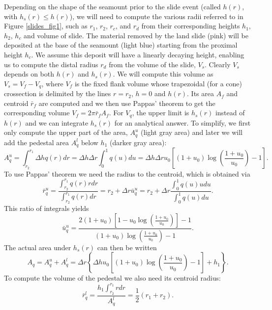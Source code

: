 \documentclass[12pt,letterpaper,margin=0.5in]{report}
\begin{document}
Depending on the shape of the seamount prior to the slide event (called $h(r)$, with $h_s(r) \le h(r)$), we will need to compute the various radii referred
to in Figure \ref{slides_fig1}, such as $r_1$, $r_2$, $r_c$, and $r_d$ from their corresponding heights $h_1$, $h_2$, $h_c$ and volume of slide.
The material removed by the land slide (pink)
will be deposited at the base of the seamount (light blue) starting from the proximal height $h_c$.  We assume this deposit will have a linearly
decaying height, enabling us to compute the distal radius $r_d$ from the volume of the slide, $V_s$.  Clearly $V_s$ depends
on both $h(r)$ and $h_s(r)$.  We will compute this volume as $V_s = V_f - V_q$, where $V_f$ is the fixed flank volume whose
trapezoidal (for a cone) crossection is delimited by the lines $r = r_2$, $h = 0$ and $h(r)$.  Its area $A_f$ and centroid $\bar{r}_f$ are computed and
we then use Pappas' theorem to get the corresponding volume $V_f = 2 \pi \bar{r}_f A_f$.  For $V_q$, the upper limit is $h_s(r)$ instead of $h(r)$ and we can integrate
$h_s(r)$ for an analytical answer. To simplify, we first only compute the upper part of the area, $A^u_q$ (light gray area)
and later we will add the pedestal area $A^l_q$ below $h_1$ (darker gray area):
\begin{equation}
A^u_q = \int_{r_2}^{r_1} \Delta h q(r) dr = \Delta h \Delta r \int_0^1 q(u) du = \Delta h \Delta r u_0 \left [ (1 + u_0) \log \left (\frac{1 + u_0}{u_0} \right ) - 1 \right ].
\end{equation}
To use Pappas' theorem we need the radius to the centroid, which is obtained via
\begin{equation}
\bar{r}^u_q = \frac{\int_{r_2}^{r_1}q(r)rdr}{\int_{r_2}^{r_1}q(r)dr} = r_2 + \Delta r \bar{u}_q^u = r_2 + \Delta r \frac{\int_0^1q(u)udu}{\int_0^1 q(u)du}.
\end{equation}
This ratio of integrals yields
\begin{equation}
\bar{u}^u_q = \frac{2(1 + u_0)\left [1 - u_0 \log \left ( \frac{1+u_0}{u_0} \right ) \right ] - 1}{(1 + u_0) \log \left (\frac{1 + u_0}{u_0} \right ) - 1}.
\end{equation}
The actual area under $h_s(r)$ can then be written
\begin{equation}
A_q = A^u_q + A^l_q =  \Delta r \left \{\Delta h u_0 \left [ (1 + u_0) \log \left (\frac{1 + u_0}{u_0} \right ) - 1 \right ] + h_1 \right \}.
\end{equation}
To compute the volume of the pedestal we also need its centroid radius:
\begin{equation}
\bar{r}^l_q = \frac{ h_1\int_{r_2}^{r_1} rdr}{A^l_q} = \frac{1}{2} (r_1 + r_2).
\end{equation}
\end{document}
